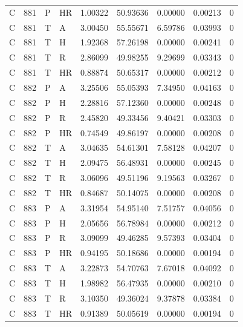 \begin{longtable}{lllllllll}
C & 881 & P & HR & 1.00322 & 50.93636 & 0.00000 & 0.00213 & 0\\
C & 881 & T & A & 3.00450 & 55.55671 & 6.59786 & 0.03993 & 0\\
C & 881 & T & H & 1.92368 & 57.26198 & 0.00000 & 0.00241 & 0\\
C & 881 & T & R & 2.86099 & 49.98255 & 9.29699 & 0.03343 & 0\\
C & 881 & T & HR & 0.88874 & 50.65317 & 0.00000 & 0.00212 & 0\\
C & 882 & P & A & 3.25506 & 55.05393 & 7.34950 & 0.04163 & 0\\
C & 882 & P & H & 2.28816 & 57.12360 & 0.00000 & 0.00248 & 0\\
C & 882 & P & R & 2.45820 & 49.33456 & 9.40421 & 0.03303 & 0\\
C & 882 & P & HR & 0.74549 & 49.86197 & 0.00000 & 0.00208 & 0\\
C & 882 & T & A & 3.04635 & 54.61301 & 7.58128 & 0.04207 & 0\\
C & 882 & T & H & 2.09475 & 56.48931 & 0.00000 & 0.00245 & 0\\
C & 882 & T & R & 3.06096 & 49.51196 & 9.19563 & 0.03267 & 0\\
C & 882 & T & HR & 0.84687 & 50.14075 & 0.00000 & 0.00208 & 0\\
C & 883 & P & A & 3.31954 & 54.95140 & 7.51757 & 0.04056 & 0\\
C & 883 & P & H & 2.05656 & 56.78984 & 0.00000 & 0.00212 & 0\\
C & 883 & P & R & 3.09099 & 49.46285 & 9.57393 & 0.03404 & 0\\
C & 883 & P & HR & 0.94195 & 50.18686 & 0.00000 & 0.00194 & 0\\
C & 883 & T & A & 3.22873 & 54.70763 & 7.67018 & 0.04092 & 0\\
C & 883 & T & H & 1.98982 & 56.47935 & 0.00000 & 0.00210 & 0\\
C & 883 & T & R & 3.10350 & 49.36024 & 9.37878 & 0.03384 & 0\\
C & 883 & T & HR & 0.91389 & 50.05619 & 0.00000 & 0.00194 & 0\\
\bottomrule
\end{longtable}
